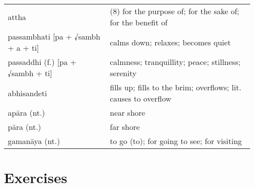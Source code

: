\documentclass[11pt,oneside]{memoir}
\begin{document}
\begin{longtable}{L{\colOne} L{\colTwo}}
attha & (8) for the purpose of; for the sake of; for the benefit of\\[0pt]
passambhati [pa + √sambh + a + ti] & calms down; relaxes; becomes quiet\\[0pt]
passaddhi (f.) [pa + √sambh + ti] & calmness; tranquillity; peace; stillness; serenity\\[0pt]
abhisandeti & fills up; fills to the brim; overflows; lit. causes to overflow\\[0pt]
apāra (nt.) & near shore\\[0pt]
pāra (nt.) & far shore\\[0pt]
gamanāya (nt.) & to go (to); for going to see; for visiting\\[0pt]
\end{longtable}

\clearpage

\section{Exercises}
\label{sec:org6df3ef6}

\vspace*{-0.5\baselineskip}
\enlargethispage{2\baselineskip}
\renewcommand{\arraystretch}{1.4}
\end{document}
